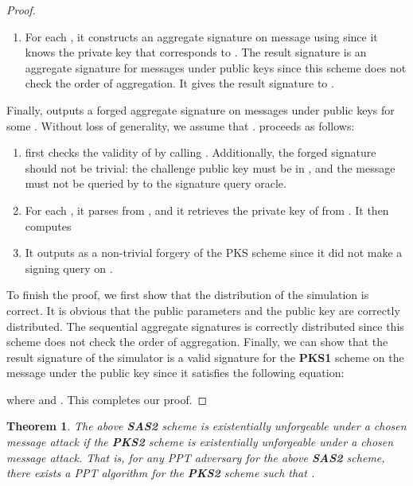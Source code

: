\documentclass[11pt,letterpaper]{article}
\newtheorem{theorem}{Theorem}[section]
\newcommand{\tb}[1]{\textbf{#1}}
\begin{document}
\begin{proof}
\begin{enumerate}
\item For each , it constructs an aggregate signature on
    message  using  since it knows the private
    key that corresponds to . The result signature is an aggregate
    signature for messages  under public keys  since this scheme does not check the order of aggregation. It
    gives the result signature  to .
\end{enumerate}
Finally,  outputs a forged aggregate signature  on messages  under
public keys  for some . Without loss
of generality, we assume that .  proceeds as follows:
\begin{enumerate}
\item  first checks the validity of  by calling
    . Additionally, the forged signature should
    not be trivial: the challenge public key  must be in
    , and the message  must not be queried by  to
    the signature query oracle.

\item For each , it parses  from , and it retrieves the private key  of  from . It then computes
    

\item It outputs  as a non-trivial
    forgery of the PKS scheme since it did not make a signing query on
    .
\end{enumerate}

To finish the proof, we first show that the distribution of the simulation is
correct. It is obvious that the public parameters and the public key are
correctly distributed. The sequential aggregate signatures is correctly
distributed since this scheme does not check the order of aggregation.
Finally, we can show that the result signature  of the simulator is a valid signature for the \tb{PKS1} scheme on
the message  under the public key  since it satisfies the
following equation:
    
where  and . This completes our proof.
\end{proof}

\begin{theorem} \label{thm:sas2-prime}
The above \tb{SAS2} scheme is existentially unforgeable under a chosen
message attack if the \tb{PKS2} scheme is existentially unforgeable under a
chosen message attack. That is, for any PPT adversary  for the above
\tb{SAS2} scheme, there exists a PPT algorithm  for the \tb{PKS2}
scheme such that
    .
\end{theorem}
\end{document}
